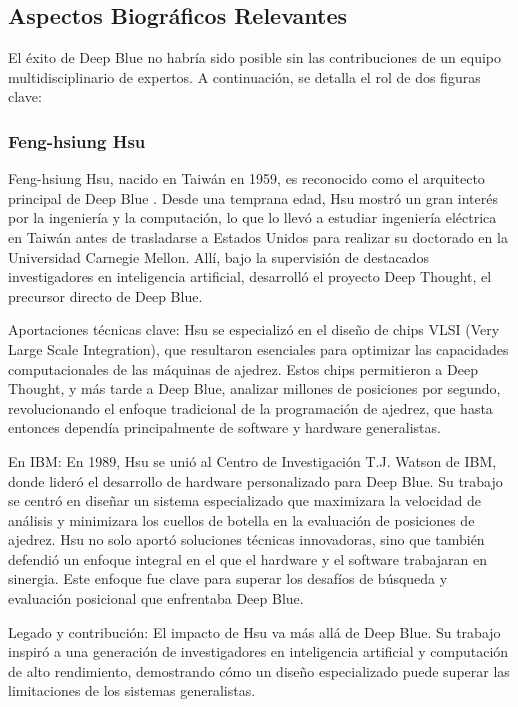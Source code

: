 \documentclass[12pt,a4paper]{article}
\begin{document}
\subsection{Aspectos Biográficos Relevantes}
El éxito de Deep Blue no habría sido posible sin las contribuciones de un equipo multidisciplinario de expertos. A continuación, se detalla el rol de dos figuras clave:

\subsubsection*{Feng-hsiung Hsu}
Feng-hsiung Hsu, nacido en Taiwán en 1959, es reconocido como el arquitecto principal de Deep Blue \cite{hsu2002deep}. Desde una temprana edad, Hsu mostró un gran interés por la ingeniería y la computación, lo que lo llevó a estudiar ingeniería eléctrica en Taiwán antes de trasladarse a Estados Unidos para realizar su doctorado en la Universidad Carnegie Mellon. Allí, bajo la supervisión de destacados investigadores en inteligencia artificial, desarrolló el proyecto Deep Thought, el precursor directo de Deep Blue.

Aportaciones técnicas clave:
Hsu se especializó en el diseño de chips VLSI (Very Large Scale Integration), que resultaron esenciales para optimizar las capacidades computacionales de las máquinas de ajedrez. Estos chips permitieron a Deep Thought, y más tarde a Deep Blue, analizar millones de posiciones por segundo, revolucionando el enfoque tradicional de la programación de ajedrez, que hasta entonces dependía principalmente de software y hardware generalistas.

En IBM:
En 1989, Hsu se unió al Centro de Investigación T.J. Watson de IBM, donde lideró el desarrollo de hardware personalizado para Deep Blue. Su trabajo se centró en diseñar un sistema especializado que maximizara la velocidad de análisis y minimizara los cuellos de botella en la evaluación de posiciones de ajedrez.
Hsu no solo aportó soluciones técnicas innovadoras, sino que también defendió un enfoque integral en el que el hardware y el software trabajaran en sinergia. Este enfoque fue clave para superar los desafíos de búsqueda y evaluación posicional que enfrentaba Deep Blue.

Legado y contribución:
El impacto de Hsu va más allá de Deep Blue. Su trabajo inspiró a una generación de investigadores en inteligencia artificial y computación de alto rendimiento, demostrando cómo un diseño especializado puede superar las limitaciones de los sistemas generalistas.
\end{document}
